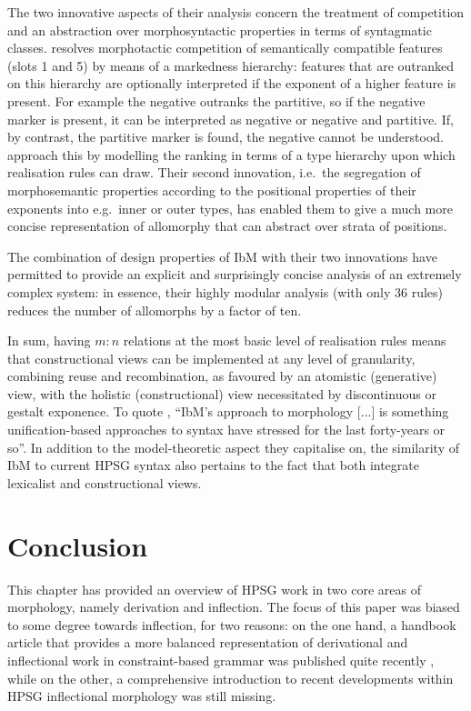 \documentclass[output=paper,biblatex,babelshorthands,newtxmath,draftmode,colorlinks,citecolor=brown]{langscibook}
\begin{document}
\begin{exe}
\begin{xlist}
\begin{exe}
\begin{xlist}
The two innovative aspects of their analysis concern the treatment of
competition and an abstraction over morphosyntactic properties in
terms of syntagmatic classes.  resolves morphotactic
competition of semantically compatible features (slots 1 and 5) by
means of a markedness hierarchy: features that are outranked on this
hierarchy are optionally interpreted if the exponent of a higher
feature is present. For example the negative outranks the partitive,
so if the negative marker is present, it can be interpreted as
negative or negative and partitive. If, by contrast, the partitive
marker is found, the negative cannot be understood.
\citet{diaz:koenig:michelson:19} approach this by modelling the
ranking in terms of a type hierarchy upon which realisation rules can
draw. Their second innovation, i.e.\ the segregation of morphosemantic
properties according to the positional properties of their exponents
into e.g.\ inner or outer types, has enabled them to give a much more
concise representation of allomorphy that can abstract over strata of
positions.

The combination of design properties of IbM with their two innovations
have permitted \citet{diaz:koenig:michelson:19} to provide an explicit
and surprisingly concise analysis of an extremely complex system: in
essence, their highly modular analysis (with only 36 rules) reduces
the number of allomorphs by a factor of ten.

\medskip
In sum, having $m:n$ relations at the most basic
level of realisation rules means that constructional views can be
implemented at any level of granularity, combining reuse and
recombination, as favoured by an atomistic (generative) view, with the
holistic (constructional) view necessitated by discontinuous or
gestalt exponence.  To quote \citet{diaz:koenig:michelson:19}, ``IbM's
approach to morphology [...] is something unification-based approaches
to syntax have stressed for the last forty-years or so''. In addition
to the model-theoretic aspect they capitalise on, the similarity of
IbM to current HPSG syntax also pertains to the fact that both
integrate lexicalist and constructional views.%

\section{Conclusion}

This chapter has provided an overview of HPSG work in two core areas
of morphology, namely derivation and inflection. The focus of this
paper was biased to some degree towards inflection, for two reasons:
on the one hand, a handbook article that provides a more balanced
representation of derivational and inflectional work in
constraint-based grammar was published quite recently
\citep{Bonami15b}, while on the other, a comprehensive introduction
to recent developments within HPSG inflectional morphology was still
missing.


\end{xlist}
\end{exe}
\end{xlist}
\end{exe}
\end{document}
